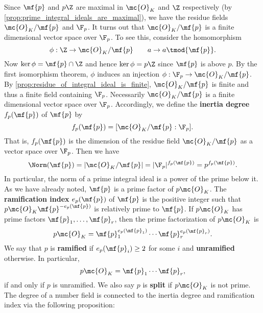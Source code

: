     Since $\mf{p}$ and $p\Z$ are maximal in $\mc{O}_{K}$ and $\Z$ respectively (by \cref{prop:prime_integral_ideals_are_maximal}), we have the residue fields $\mc{O}_{K}/\mf{p}$ and $\F_{p}$. It turns out that $\mc{O}_{K}/\mf{p}$ is a finite dimensional vector space over $\F_{p}$. To see this, consider the homomorphism
    \[
      \phi:\Z \to \mc{O}_{K}/\mf{p} \qquad a \to a \tmod{\mf{p}}.
    \]
    Now $\ker\phi = \mf{p} \cap \Z$ and hence $\ker\phi = p\Z$ since $\mf{p}$ is above $p$. By the first isomorphism theorem, $\phi$ induces an injection $\phi:\F_{p} \to \mc{O}_{K}/\mf{p}$. By \cref{prop:residue_of_integral_ideal_is_finite}, $\mc{O}_{K}/\mf{p}$ is finite and thus a finite field containing $\F_{p}$. Necessarily $\mc{O}_{K}/\mf{p}$ is a finite dimensional vector space over $\F_{p}$. Accordingly, we define the \textbf{inertia degree} $f_{p}(\mf{p})$ of $\mf{p}$ by
    \[
      f_{p}(\mf{p}) = [\mc{O}_{K}/\mf{p}:\F_{p}].
    \]
    That is, $f_{p}(\mf{p})$ is the dimension of the residue field $\mc{O}_{K}/\mf{p}$ as a vector space over $\F_{p}$. Then we have
    \[
      \Norm(\mf{p}) = |\mc{O}_{K}/\mf{p}| = |\F_{p}|^{f_{p}(\mf{p})} = p^{f_{p}(\mf{p})}.
    \]
    In particular, the norm of a prime integral ideal is a power of the prime below it. As we have already noted, $\mf{p}$ is a prime factor of $p\mc{O}_{K}$. The \textbf{ramification index} $e_{p}(\mf{p})$ of $\mf{p}$ is the positive integer such that $p\mc{O}_{K}\mf{p}^{-e_{p}(\mf{p})}$ is relatively prime to $\mf{p}$. If $p\mc{O}_{K}$ has prime factors $\mf{p}_{1},\ldots,\mf{p}_{r}$, then the prime factorization of $p\mc{O}_{K}$ is
    \[
      p\mc{O}_{K} = \mf{p}_{1}^{e_{p}(\mf{p}_{1})} \cdots \mf{p}_{r}^{e_{p}(\mf{p}_{r})}.
    \]
    We say that $p$ is \textbf{ramified} if $e_{p}(\mf{p}_{i}) \ge 2$ for some $i$ and \textbf{unramified} otherwise. In particular,
    \[
      p\mc{O}_{K} = \mf{p}_{1} \cdots \mf{p}_{r},
    \]
    if and only if $p$ is unramified. We also say $p$ is \textbf{split} if $p\mc{O}_{K}$ is not prime. The degree of a number field is connected to the inertia degree and ramification index via the following proposition:

